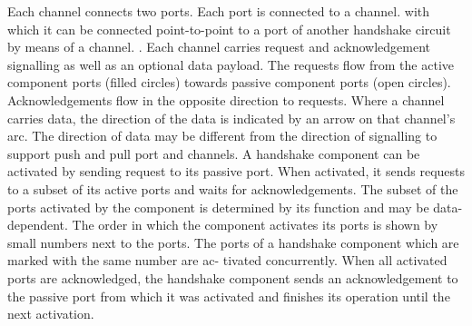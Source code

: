  Each channel connects two ports. Each port is connected to a channel. 
with which it
can be connected point-to-point to a port of another handshake circuit by means of a channel. 
. Each
channel carries request and acknowledgement signalling as well as an optional data payload. The
requests flow from the active component ports (filled circles) towards passive component ports
(open circles). Acknowledgements flow in the opposite direction to requests. Where a channel
carries data, the direction of the data is indicated by an arrow on that channel’s arc. The direction
of data may be different from the direction of signalling to support push and pull port and channels.
A handshake component can be activated by sending request to its passive port. When activated, 
it sends requests to a subset of its active ports and waits for acknowledgements. The
subset of the ports activated by the component is determined by its function and may be data-
dependent. The order in which the component activates its ports is shown by small numbers next
to the ports. The ports of a handshake component which are marked with the same number are ac-
tivated concurrently. When all activated ports are acknowledged, the handshake component sends
an acknowledgement to the passive port from which it was activated and finishes its operation until
the next activation.
